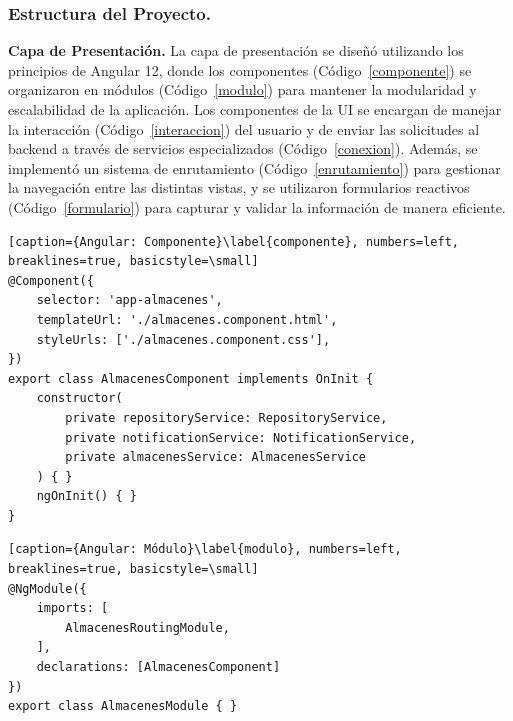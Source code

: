 \documentclass[stu, 12pt, letterpaper, donotrepeattitle, floatsintext, natbib]{apa7}
\begin{document}
\subsubsection{Estructura del Proyecto.}
\textbf{Capa de Presentación. }La capa de presentación se diseñó utilizando los principios de Angular 12, donde los componentes
(Código~\ref{componente}) se organizaron en módulos (Código~\ref{modulo}) para mantener la modularidad y escalabilidad de la aplicación. Los
componentes de la UI se encargan de manejar la interacción (Código~\ref{interaccion}) del usuario y de enviar las solicitudes al backend a
través de servicios especializados (Código~\ref{conexion}). Además, se implementó un sistema de enrutamiento (Código~\ref{enrutamiento}) para
gestionar la navegación entre las distintas vistas, y se utilizaron formularios reactivos (Código~\ref{formulario}) para capturar y validar
la información de manera eficiente.
\begin{lstlisting}[caption={Angular: Componente}\label{componente}, numbers=left, breaklines=true, basicstyle=\small]
@Component({
    selector: 'app-almacenes',
    templateUrl: './almacenes.component.html',
    styleUrls: ['./almacenes.component.css'],
})
export class AlmacenesComponent implements OnInit {
    constructor(
        private repositoryService: RepositoryService,
        private notificationService: NotificationService,
        private almacenesService: AlmacenesService
    ) { }
    ngOnInit() { }
}
\end{lstlisting}
\begin{lstlisting}[caption={Angular: Módulo}\label{modulo}, numbers=left, breaklines=true, basicstyle=\small]
@NgModule({
    imports: [
        AlmacenesRoutingModule,
    ],
    declarations: [AlmacenesComponent]
})
export class AlmacenesModule { }
\end{lstlisting}
\end{document}
